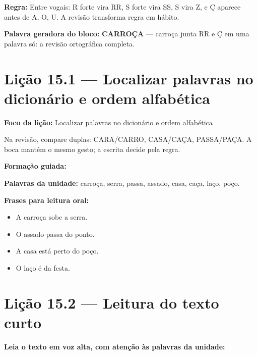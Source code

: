 \textbf{Regra:} Entre vogais: R forte vira RR, S forte vira SS, S vira Z, e Ç aparece antes de A, O, U. A revisão transforma regra em hábito.

\textbf{Palavra geradora do bloco:} \textbf{CARROÇA} --- carroça junta RR e Ç em uma palavra só: a revisão ortográfica completa.

\section{Lição 15.1 --- Localizar palavras no dicionário e ordem alfabética}

\textbf{Foco da lição:} Localizar palavras no dicionário e ordem alfabética


\begin{boquinha}
Na revisão, compare duplas: CARA/CARRO, CASA/CAÇA, PASSA/PAÇA. A boca mantém o mesmo gesto; a escrita decide pela regra.
\end{boquinha}

\noindent\textbf{Formação guiada:}

\begin{center}
\end{center}

\noindent\textbf{Palavras da unidade:} carroça, serra, passa, assado, casa, caça, laço, poço.

\noindent\textbf{Frases para leitura oral:}
\begin{itemize}[leftmargin=1.6em]
  \item A carroça sobe a serra.
  \item O assado passa do ponto.
  \item A casa está perto do poço.
  \item O laço é da festa.
\end{itemize}

\section{Lição 15.2 --- Leitura do texto curto}

\noindent\textbf{Leia o texto em voz alta, com atenção às palavras da unidade:}


